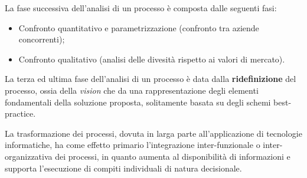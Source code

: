 \documentclass[a4paper, 11pt]{article}
\begin{document}
	La fase successiva dell'analisi di un processo è composta dalle seguenti fasi: \begin{itemize}
		\item Confronto quantitativo e parametrizzazione (confronto tra aziende concorrenti);
		\item Confronto qualitativo (analisi delle divesità rispetto ai valori di mercato).
	\end{itemize}

	La terza ed ultima fase dell'analisi di un processo è data dalla \textbf{ridefinizione} del processo, ossia della \textit{vision} che da una rappresentazione degli elementi fondamentali della soluzione proposta, solitamente basata su degli schemi best-practice.
	
	La trasformazione dei processi, dovuta in larga parte all'applicazione di tecnologie informatiche, ha come effetto primario l’integrazione inter-funzionale o inter-organizzativa dei processi, in quanto aumenta al disponibilità di informazioni e supporta l'esecuzione di compiti individuali di natura decisionale.
	
	
	
	
	
	
	
	
	
\end{document}
